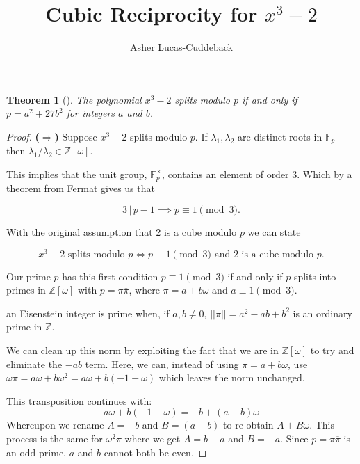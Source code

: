 \documentclass{tufte-handout}
\title{Cubic Reciprocity for \(x^3-2\)}
\author[Asher]{Asher Lucas-Cuddeback}
\newtheorem{thm}{Theorem}
\begin{document}
\maketitle

\begin{thm}[{\citep[Theorem 4.15]{cox_primes_2022}}]
  The polynomial \(x^3-2\) splits modulo \(p\) if and only if
  \(p=a^2+27b^2\) for integers \(a\) and \(b\).
\end{thm}
\begin{proof}
  \textbf{(\(\Rightarrow\))} Suppose \(x^3-2\) splits modulo \(p\).
  If \(\lambda_1, \lambda_2\) are distinct roots in \(\mathbb{F}_p\)
  then \(\lambda_1 / \lambda_2 \in\mathbb{Z}[\omega]\).

  This implies that the unit group, \(\mathbb{F}_p^\times\), contains
  an element of order 3. Which by a theorem from Fermat gives us that

  \[3\,|\,p-1 \implies p\equiv 1\pmod{3}.\]

  With the original assumption that 2 is a cube modulo \(p\) we can state

  \[x^3-2 \text{ splits modulo } p\iff p\equiv 1\pmod{3}\text{ and 2
  is a cube modulo } p.\]

  Our prime \(p\) has this first condition \(p\equiv 1\pmod{3}\) if
  and only if \(p\) splits into primes in \(\mathbb{Z}[\omega]\) with
  \(p=\pi\overline{\pi}\), where \(\pi=a+b\omega\) and \(a\equiv 1\pmod{3}\).

   an Eisenstein integer is prime when, if
  \(a,b\neq 0\), \(||\pi||= a^2-ab+b^2\) is an ordinary prime in \(\mathbb{Z}\).

  We can clean up this norm by exploiting the fact that we are in
  \(\mathbb{Z}[\omega]\) to try and eliminate the \(-ab\) term.
  Here, we can, instead of using \(\pi=a+b\omega\), use
  \(\omega\pi=a\omega+b\omega^2=a\omega+b(-1-\omega)\) which leaves
  the norm unchanged.

  This transposition continues with:
  \[a\omega+b(-1-\omega)=-b + (a-b)\omega\]
  Whereupon we rename \(A=-b\) and \(B=(a-b)\) to re-obtain
  \(A+B\omega\). This process is the same for \(\omega^2\pi\) where we get
  \(A=b-a\) and \(B=-a\). Since \(p=\pi\overline{\pi}\) is an odd
  prime, \(a\) and \(b\) cannot both be even.


\end{proof}
\end{document}
